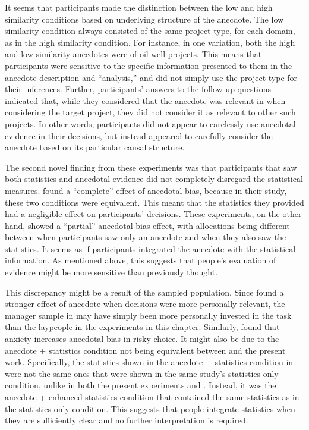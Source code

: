 \documentclass[a4paper, nobind, dvipsnames]{templates/ociamthesis}
\theoremstyle{definition}
\theoremstyle{definition}
\theoremstyle{definition}
\theoremstyle{definition}
\theoremstyle{remark}
\begin{document}
It seems that participants made the distinction between the low and high
similarity conditions based on underlying structure of the anecdote. The low
similarity condition always consisted of the same project type, for each domain,
as in the high similarity condition. For instance, in one variation, both the
high and low similarity anecdotes were of oil well projects. This means that
participants were sensitive to the specific information presented to them in the
anecdote description and ``analysis,'' and did not simply use the project type for
their inferences. Further, participants' answers to the follow up questions
indicated that, while they considered that the anecdote was relevant in when
considering the target project, they did not consider it as relevant to other
such projects. In other words, participants did not appear to carelessly use
anecdotal evidence in their decisions, but instead appeared to carefully
consider the anecdote based on its particular causal structure.

The second novel finding from these experiments was that participants that saw
both statistics and anecdotal evidence did not completely disregard the
statistical measures. \textcite{wainberg2013} found a ``complete'' effect of anecdotal bias,
because in their study, these two conditions were equivalent. This meant that
the statistics they provided had a negligible effect on participants' decisions.
These experiments, on the other hand, showed a ``partial'' anecdotal bias effect,
with allocations being different between when participants saw only an anecdote
and when they also saw the statistics. It seems as if participants integrated
the anecdote with the statistical information. As mentioned above, this suggests
that people's evaluation of evidence might be more sensitive than previously
thought.

This discrepancy might be a result of the sampled population. Since \textcite{freling2020}
found a stronger effect of anecdote when decisions were more personally
relevant, the manager sample in \textcite{wainberg2013} may have simply been more
personally invested in the task than the laypeople in the experiments in this
chapter. Similarly, \textcite{yang2015} found that anxiety increases anecdotal bias in
risky choice. It might also be due to the anecdote + statistics condition not
being equivalent between \textcite{wainberg2013} and the present work. Specifically, the
statistics shown in the anecdote + statistics condition in \textcite{wainberg2013} were
not the same ones that were shown in the same study's statistics only condition,
unlike in both the present experiments and \textcite{wainberg2018}. Instead, it was the
anecdote + enhanced statistics condition that contained the same statistics as
in the statistics only condition. This suggests that people integrate statistics
when they are sufficiently clear and no further interpretation is required.
\end{document}
